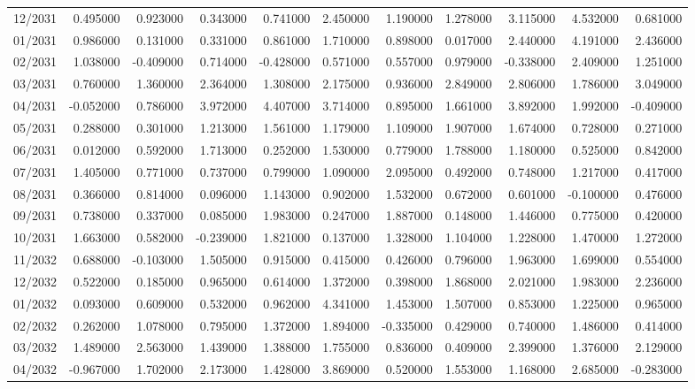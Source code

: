 \begin{tabular}{lrrrrrrrrrr}
12/2031 & 0.495000 & 0.923000 & 0.343000 & 0.741000 & 2.450000 & 1.190000 & 1.278000 & 3.115000 & 4.532000 & 0.681000 \\
01/2031 & 0.986000 & 0.131000 & 0.331000 & 0.861000 & 1.710000 & 0.898000 & 0.017000 & 2.440000 & 4.191000 & 2.436000 \\
02/2031 & 1.038000 & -0.409000 & 0.714000 & -0.428000 & 0.571000 & 0.557000 & 0.979000 & -0.338000 & 2.409000 & 1.251000 \\
03/2031 & 0.760000 & 1.360000 & 2.364000 & 1.308000 & 2.175000 & 0.936000 & 2.849000 & 2.806000 & 1.786000 & 3.049000 \\
04/2031 & -0.052000 & 0.786000 & 3.972000 & 4.407000 & 3.714000 & 0.895000 & 1.661000 & 3.892000 & 1.992000 & -0.409000 \\
05/2031 & 0.288000 & 0.301000 & 1.213000 & 1.561000 & 1.179000 & 1.109000 & 1.907000 & 1.674000 & 0.728000 & 0.271000 \\
06/2031 & 0.012000 & 0.592000 & 1.713000 & 0.252000 & 1.530000 & 0.779000 & 1.788000 & 1.180000 & 0.525000 & 0.842000 \\
07/2031 & 1.405000 & 0.771000 & 0.737000 & 0.799000 & 1.090000 & 2.095000 & 0.492000 & 0.748000 & 1.217000 & 0.417000 \\
08/2031 & 0.366000 & 0.814000 & 0.096000 & 1.143000 & 0.902000 & 1.532000 & 0.672000 & 0.601000 & -0.100000 & 0.476000 \\
09/2031 & 0.738000 & 0.337000 & 0.085000 & 1.983000 & 0.247000 & 1.887000 & 0.148000 & 1.446000 & 0.775000 & 0.420000 \\
10/2031 & 1.663000 & 0.582000 & -0.239000 & 1.821000 & 0.137000 & 1.328000 & 1.104000 & 1.228000 & 1.470000 & 1.272000 \\
11/2032 & 0.688000 & -0.103000 & 1.505000 & 0.915000 & 0.415000 & 0.426000 & 0.796000 & 1.963000 & 1.699000 & 0.554000 \\
12/2032 & 0.522000 & 0.185000 & 0.965000 & 0.614000 & 1.372000 & 0.398000 & 1.868000 & 2.021000 & 1.983000 & 2.236000 \\
01/2032 & 0.093000 & 0.609000 & 0.532000 & 0.962000 & 4.341000 & 1.453000 & 1.507000 & 0.853000 & 1.225000 & 0.965000 \\
02/2032 & 0.262000 & 1.078000 & 0.795000 & 1.372000 & 1.894000 & -0.335000 & 0.429000 & 0.740000 & 1.486000 & 0.414000 \\
03/2032 & 1.489000 & 2.563000 & 1.439000 & 1.388000 & 1.755000 & 0.836000 & 0.409000 & 2.399000 & 1.376000 & 2.129000 \\
04/2032 & -0.967000 & 1.702000 & 2.173000 & 1.428000 & 3.869000 & 0.520000 & 1.553000 & 1.168000 & 2.685000 & -0.283000 \\

\end{tabular}
